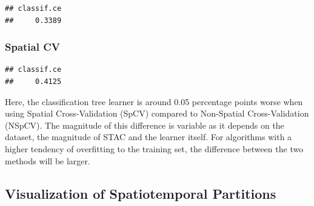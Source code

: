 \documentclass[
]{scrbook}
\newenvironment{Shaded}{\begin{snugshade}}{\end{snugshade}}
\newcommand{\AttributeTok}[1]{\textcolor[rgb]{0.77,0.63,0.00}{#1}}
\newcommand{\DecValTok}[1]{\textcolor[rgb]{0.00,0.00,0.81}{#1}}
\newcommand{\FunctionTok}[1]{\textcolor[rgb]{0.00,0.00,0.00}{#1}}
\newcommand{\NormalTok}[1]{#1}
\newcommand{\OtherTok}[1]{\textcolor[rgb]{0.56,0.35,0.01}{#1}}
\newcommand{\SpecialCharTok}[1]{\textcolor[rgb]{0.00,0.00,0.00}{#1}}
\newcommand{\StringTok}[1]{\textcolor[rgb]{0.31,0.60,0.02}{#1}}
\renewenvironment{Shaded} {\begin{snugshade}\small} {\end{snugshade}}
\begin{document}
\begin{verbatim}
## classif.ce 
##     0.3389
\end{verbatim}

\hypertarget{sp-cv}{%
\subsubsection{Spatial CV}\label{sp-cv}}

\begin{Shaded}
\end{Shaded}

\begin{verbatim}
## classif.ce 
##     0.4125
\end{verbatim}

Here, the classification tree learner is around 0.05 percentage points worse when using Spatial Cross-Validation (SpCV) compared to Non-Spatial Cross-Validation (NSpCV).
The magnitude of this difference is variable as it depends on the dataset, the magnitude of STAC and the learner itself.
For algorithms with a higher tendency of overfitting to the training set, the difference between the two methods will be larger.

\hypertarget{vis-spt-partitions}{%
\subsection{Visualization of Spatiotemporal Partitions}\label{vis-spt-partitions}}
\end{document}
